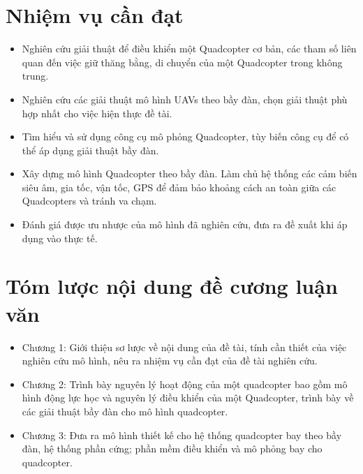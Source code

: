     \section{Nhiệm vụ cần đạt}
    \begin{itemize}
        \item Nghiên cứu giải thuật để điều khiển một Quadcopter cơ bản, các tham số liên quan đến việc giữ thăng bằng, di chuyển của một Quadcopter trong không trung.
        \item Nghiên cứu các giải thuật mô hình UAVs theo bầy đàn, chọn giải thuật phù hợp nhất cho việc hiện thực đề tài.
        \item Tìm hiểu và sử dụng công cụ mô phỏng Quadcopter, tùy biến công cụ để có thể áp dụng giải thuật bầy đàn.
        \item Xây dựng mô hình Quadcopter theo bầy đàn. Làm chủ hệ thống các cảm biến siêu âm, gia tốc, vận tốc, GPS để đảm bảo khoảng cách an toàn giữa các Quadcopters và tránh va chạm.
        \item Đánh giá được ưu nhược của mô hình đã nghiên cứu, đưa ra đề xuất khi áp dụng vào thực tế.
    \end{itemize}

    \section{Tóm lược nội dung đề cương luận văn}
        \begin{itemize}
            \item Chương 1: Giới thiệu sơ lược về nội dung của đề tài, tính cần thiết của việc nghiên cứu mô hình, nêu ra nhiệm vụ cần đạt của đề tài nghiên cứu.
            \item Chương 2: Trình bày nguyên lý hoạt động của một quadcopter bao gồm mô hình động lực học và nguyên lý điều khiển của một Quadcopter, trình bày về các giải thuật bầy đàn cho mô hình quadcopter.
            \item Chương 3: Đưa ra mô hình thiết kế cho hệ thống quadcopter bay theo bầy đàn, hệ thống phần cứng; phần mềm điều khiển và mô phỏng bay cho quadcopter.
        \end{itemize}

